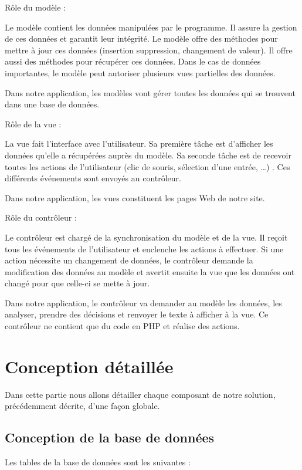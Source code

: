\begin{description}

 {\bf \item Rôle du modèle :}

Le modèle contient les données manipulées par le programme. Il assure la gestion de ces données et garantit leur intégrité. 
Le modèle offre des méthodes pour mettre à jour ces données (insertion suppression, changement de valeur). Il offre aussi des méthodes pour récupérer ces données. Dans le cas de données importantes, le modèle peut autoriser plusieurs vues partielles des données. 

Dans notre application, les modèles vont gérer toutes les données qui se trouvent  dans une base de données.


{\bf \item  Rôle de la vue :}

La vue fait l'interface avec l'utilisateur. Sa première tâche est d'afficher les données qu'elle a récupérées auprès du modèle. Sa seconde tâche est de recevoir toutes les actions de l'utilisateur (clic de souris, sélection d'une entrée, …) . Ces différents événements sont envoyés au contrôleur.

Dans notre application, les vues constituent les pages Web de notre site.


{\bf \item Rôle du contrôleur :}

Le contrôleur est chargé de la synchronisation du modèle et de la vue. Il reçoit tous les événements de l'utilisateur et enclenche les actions à effectuer. 
Si une action nécessite un changement de données, le contrôleur demande la modification des données au modèle et  avertit ensuite la vue que les données ont changé pour que celle-ci se mette à jour.

Dans notre application, le contrôleur va demander au modèle les données, les analyser,  prendre des décisions et renvoyer le texte à afficher à la vue. Ce contrôleur ne contient que du code en PHP et réalise des actions.

\end{description}
\section{Conception détaillée}
Dans cette partie nous allons détailler chaque composant de notre solution, précédemment décrite, d'une façon globale. 
\subsection{Conception de la base de données}
Les tables de la base de données sont les suivantes : \\

